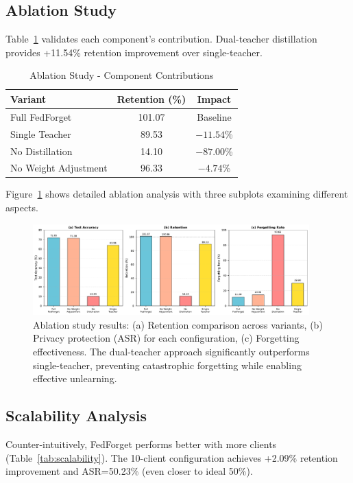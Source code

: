 \documentclass[11pt,a4paper]{article}
\begin{document}
\subsection{Ablation Study}

Table~\ref{tab:ablation} validates each component's contribution. Dual-teacher distillation provides +11.54\% retention improvement over single-teacher.

\begin{table}[htbp]
\centering
\caption{Ablation Study - Component Contributions}
\label{tab:ablation}
\begin{tabular}{lcc}
\toprule
Variant & Retention (\%) & Impact \\
\midrule
Full FedForget & 101.07 & Baseline \\
Single Teacher & 89.53 & $-11.54$\% \\
No Distillation & 14.10 & $-87.00$\% \\
No Weight Adjustment & 96.33 & $-4.74$\% \\
\bottomrule
\end{tabular}
\end{table}

Figure~\ref{fig:ablation} shows detailed ablation analysis with three subplots examining different aspects.

\begin{figure}[htbp]
\centering
\includegraphics[width=0.95\textwidth]{figures/figure2_ablation_study.pdf}
\caption{Ablation study results: (a) Retention comparison across variants, (b) Privacy protection (ASR) for each configuration, (c) Forgetting effectiveness. The dual-teacher approach significantly outperforms single-teacher, preventing catastrophic forgetting while enabling effective unlearning.}
\label{fig:ablation}
\end{figure}

\subsection{Scalability Analysis}

Counter-intuitively, FedForget performs better with more clients (Table~\ref{tab:scalability}). The 10-client configuration achieves +2.09\% retention improvement and ASR=50.23\% (even closer to ideal 50\%).
\end{document}
